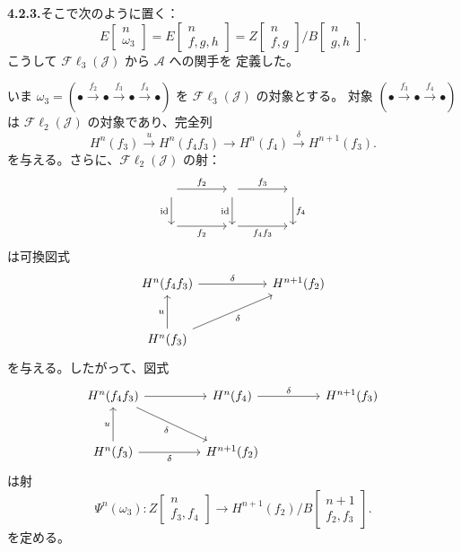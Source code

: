 \clearpage
{}%
\begingroup\small\setlength{\parskip}{0pt}\setlength{\emergencystretch}{1.5em}
\medskip\noindent\textbf{4.2.3.}\quad そこで次のように置く：
\[
E\!\left[\begin{smallmatrix}n\\\omega_3\end{smallmatrix}\right]
=E\!\left[\begin{smallmatrix}n\\f,g,h\end{smallmatrix}\right]
=Z\!\left[\begin{smallmatrix}n\\f,g\end{smallmatrix}\right]
\big/
B\!\left[\begin{smallmatrix}n\\g,h\end{smallmatrix}\right].
\tag{4.2.3.1}
\]
こうして $\mathcal{F}\ell_3(\mathcal J)$ から $\mathcal A$ への関手を
定義した。

いま
$\omega_3=(\mathord\bullet\xrightarrow{f_2}\mathord\bullet
\xrightarrow{f_3}\mathord\bullet\xrightarrow{f_4}\mathord\bullet)$
を $\mathcal{F}\ell_3(\mathcal J)$ の対象とする。
対象
$(\mathord\bullet\xrightarrow{f_3}\mathord\bullet\xrightarrow{f_4}\mathord\bullet)$
は $\mathcal{F}\ell_2(\mathcal J)$ の対象であり、完全列
\[
H^n(f_3)\xrightarrow u H^n(f_4f_3)\longrightarrow H^n(f_4)
\xrightarrow\delta H^{n+1}(f_3).
\]
を与える。さらに、$\mathcal{F}\ell_2(\mathcal J)$ の射：
\[
\begin{tikzcd}[column sep=4em,row sep=2.2em]
{}\arrow[r,"f_2"]\arrow[d,"\operatorname{id}"']&{}
 \arrow[r,"f_3"]\arrow[d,"\operatorname{id}"']&{}\arrow[d,"f_4"]\\
{}\arrow[r,"f_2"']&{}\arrow[r,"f_4f_3"']&{}
\end{tikzcd}
\]
は可換図式
\[
\begin{tikzcd}[column sep=5.5em,row sep=2.7em]
H^n(f_4f_3)\arrow[r,"\delta"]&H^{n+1}(f_2)\\
H^n(f_3)\arrow[u,"u"]\arrow[ur,"\delta"']&{}
\end{tikzcd}
\]
を与える。したがって、図式
\[
\begin{tikzcd}[column sep=4.5em,row sep=2.7em]
H^n(f_4f_3)\arrow[r]\arrow[dr,"\delta"']&
H^n(f_4)\arrow[r,"\delta"]&H^{n+1}(f_3)\\
H^n(f_3)\arrow[u,"u"]\arrow[r,"\delta"']&H^{n+1}(f_2)&{}
\end{tikzcd}
\]
は射
\[
\Psi^n(\omega_3)\colon
Z\!\left[\begin{smallmatrix}n\\f_3,f_4\end{smallmatrix}\right]
\longrightarrow
H^{n+1}(f_2)\big/
B\!\left[\begin{smallmatrix}n+1\\f_2,f_3\end{smallmatrix}\right].
\]
を定める。
\endgroup
